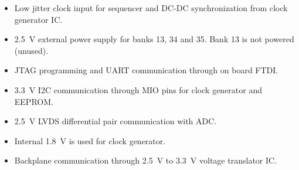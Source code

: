 \begin{itemize}
    \item Low jitter clock input for sequencer and DC-DC synchronization from clock generator IC. 
    \item \SI{2.5}{\volt} external power supply for banks 13, 34 and 35. Bank 13 is not powered (unused).
    \item JTAG programming and UART communication through on board FTDI.
    \item \SI{3.3}{\volt} I2C communication through MIO pins for clock generator and EEPROM.
    \item \SI{2.5}{\volt} LVDS differential pair communication with ADC.
    \item Internal \SI{1.8}{\volt} is used for clock generator.
    \item Backplane communication through \SI{2.5}{\volt} to \SI{3.3}{\volt} voltage translator IC.
\end{itemize}